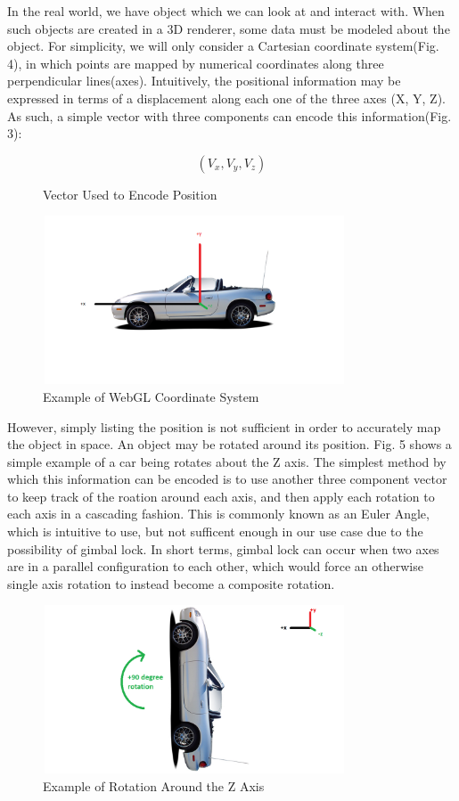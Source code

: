 \documentclass[conference]{IEEEtran}
\begin{document}
In the real world, we have object which we can look at and interact with. When such objects are created in a 3D renderer,
some data must be modeled about the object. For simplicity, we will only consider a Cartesian coordinate system(Fig. 4), in which points are mapped 
by numerical coordinates along three perpendicular lines(axes). Intuitively, the positional information may be expressed in terms of a displacement 
along each one of the three axes (X, Y, Z). As such, a simple vector with three components can encode this information(Fig. 3): 

\begin{figure}[htbp]
\[ (V_{x}, V_{y}, V_{z}) \]
\caption{Vector Used to Encode Position}
\end{figure}

\begin{figure}[htbp]
\centerline{\includegraphics [width = 9cm, height = 5cm] {fig1.png}}
\caption{Example of WebGL Coordinate System}
\end{figure}

However, simply listing the position is not sufficient in order to accurately map the object in space. An object may be rotated 
around its position. Fig. 5 shows a simple example of a car being rotates about the Z axis. The simplest method by which this information can be encoded 
is to use another three component vector to keep track of the roation around each axis, and then apply each rotation to each axis in a cascading fashion. 
This is commonly known as an Euler Angle, which is intuitive to use, but not sufficent enough in our use case due to the possibility of gimbal lock. 
In short terms, gimbal lock can occur when two axes are in a parallel configuration to each other, which would force an otherwise single axis rotation to instead 
become a composite rotation. 


\begin{figure}[htbp]
\centerline{\includegraphics [width = 9cm, height = 5cm] {fig2.png}}
\caption{Example of Rotation Around the Z Axis}
\end{figure}
\end{document}
